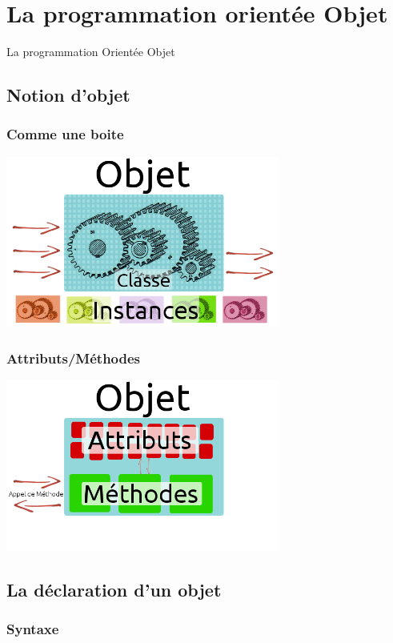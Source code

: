 \section{La programmation orientée Objet}
\begin{frame}
	\begin{center}
	\huge
	La programmation Orientée Objet
	\end{center}
\end{frame}

\subsection{Notion d'objet} %
\begin{frame}
	\frametitle{Comme une boite}
	\begin{center}
	\includegraphics[width=9cm]{pics/explObj1.png}
	\end{center}
\end{frame}
\begin{frame}
	\frametitle{Attributs/Méthodes}
	\begin{center}
	\includegraphics[width=9cm]{pics/explObj2.png}
	\end{center}
\end{frame}

\subsection{La déclaration d'un objet} %
\begin{frame}
	\frametitle{Syntaxe}
	
\end{frame}

